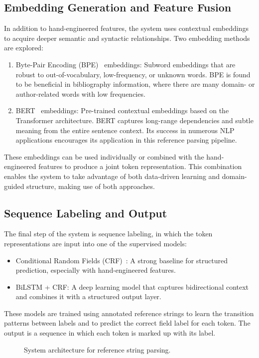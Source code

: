 \subsection{Embedding Generation and Feature Fusion}
In addition to hand-engineered features, the system uses contextual embeddings to acquire deeper semantic and syntactic relationships. Two embedding methods are explored:
\begin{enumerate}
\item Byte-Pair Encoding (BPE)~\cite{bpemb} embeddings: Subword embeddings that are robust to out-of-vocabulary, low-frequency, or unknown words. BPE is found to be beneficial in bibliography information, where there are many domain- or author-related words with low frequencies.
\item BERT~\cite{2019-bert} embeddings: Pre-trained contextual embeddings based on the Transformer architecture. BERT captures long-range dependencies and subtle meaning from the entire sentence context. Its success in numerous NLP applications encourages its application in this reference parsing pipeline.
\end{enumerate}
These embeddings can be used individually or combined with the hand-engineered features to produce a joint token representation. This combination enables the system to take advantage of both data-driven learning and domain-guided structure, making use of both approaches.

\subsection{Sequence Labeling and Output}
The final step of the system is sequence labeling, in which the token representations are input into one of the supervised models:
\begin{itemize}
\item Conditional Random Fields (CRF)~\cite{crf2001}: A strong baseline for structured prediction, especially with hand-engineered features.
\item BiLSTM + CRF: A deep learning model that captures bidirectional context and combines it with a structured output layer.
\end{itemize}
These models are trained using annotated reference strings to learn the transition patterns between labels and to predict the correct field label for each token. The output is a sequence in which each token is marked up with its label.

\begin{figure}[ht]
    \centering
    
    \caption{System architecture for reference string parsing.}
    \label{fig:system-architecture}
\end{figure}